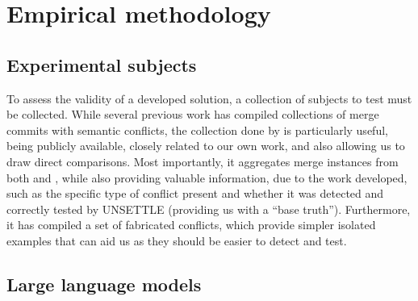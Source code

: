 \chapter{Empirical methodology}\label{chap:study}


\section{Experimental subjects}


To assess the validity of a developed solution, a collection of subjects to test must be collected. While several previous work has compiled collections of merge commits with semantic conflicts, the collection done by \citet{kn:nuno} is particularly useful, being publicly available, closely related to our own work, and also allowing us to draw direct comparisons. Most importantly, it aggregates merge instances from both \citet{kn:leuson} and \citet{kn:safemerge}, while also providing valuable information, due to the work developed, such as the specific type of conflict present and whether it was detected and correctly tested by UNSETTLE (providing us with a ``base truth''). Furthermore, it has compiled a set of fabricated conflicts, which provide simpler isolated examples that can aid us as they should be easier to detect and test.


\section{Large language models}


